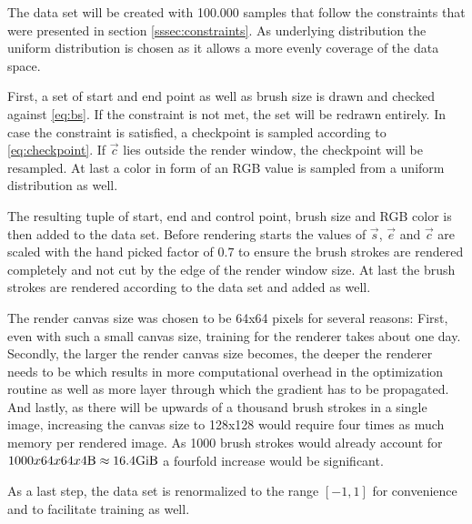 The data set will be created with 100.000 samples that follow the constraints that
were presented in section \ref{sssec:constraints}.
As underlying distribution the uniform distribution is chosen as it allows a more
evenly coverage of the data space.

First, a set of start and end point as well as brush size is drawn and checked against
\eqref{eq:bs}.
If the constraint is not met, the set will be redrawn entirely.
In case the constraint is satisfied, a checkpoint is sampled according to \eqref{eq:checkpoint}.
If $\vec{c}$ lies outside the render window, the checkpoint will be resampled.
At last a color in form of an RGB value is sampled from a uniform distribution as well.

The resulting tuple of start, end and control point, brush size and RGB color is then
added to the data set.
Before rendering starts the values of $\vec{s}$, $\vec{e}$ and $\vec{c}$ are scaled
with the hand picked factor of $0.7$ to ensure the brush strokes are rendered completely
and not cut by the edge of the render window size.
At last the brush strokes are rendered according to the data set and added as well.

The render canvas size was chosen to be 64x64 pixels for several reasons:
First, even with such a small canvas size, training for the renderer takes about
one day.
Secondly, the larger the render canvas size becomes, the deeper the renderer needs
to be which results in more computational overhead in the optimization routine as
well as more layer through which the gradient has to be propagated.
And lastly, as there will be upwards of a thousand brush strokes in a single image,
increasing the canvas size to 128x128 would require four times as much memory per
rendered image. As 1000 brush strokes would already account for
$1000 x 64 x 64 x 4 \si{\byte} \approx 16.4 \si{\gibi \byte}$ a fourfold increase
would be significant.


As a last step, the data set is renormalized to the range $[-1, 1]$ for convenience
and to facilitate training as well.


